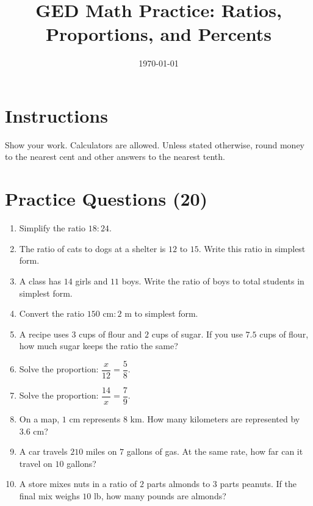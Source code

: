 \documentclass[12pt]{article}
\title{GED Math Practice: Ratios, Proportions, and Percents}
\date{\today}
\begin{document}
\maketitle

\section*{Instructions}
Show your work. Calculators are allowed. Unless stated otherwise, round money to the nearest cent and other answers to the nearest tenth.

\section*{Practice Questions (20)}
\begin{enumerate}

\item Simplify the ratio $18:24$.

\item The ratio of cats to dogs at a shelter is $12$ to $15$. Write this ratio in simplest form.

\item A class has $14$ girls and $11$ boys. Write the ratio of boys to total students in simplest form.

\item Convert the ratio $150\text{ cm} : 2\text{ m}$ to simplest form.

\item A recipe uses $3$ cups of flour and $2$ cups of sugar. If you use $7.5$ cups of flour, how much sugar keeps the ratio the same?

\item Solve the proportion: $\dfrac{x}{12} = \dfrac{5}{8}$.

\item Solve the proportion: $\dfrac{14}{x} = \dfrac{7}{9}$.

\item On a map, $1$ cm represents $8$ km. How many kilometers are represented by $3.6$ cm?

\item A car travels $210$ miles on $7$ gallons of gas. At the same rate, how far can it travel on $10$ gallons?

\item A store mixes nuts in a ratio of $2$ parts almonds to $3$ parts peanuts. If the final mix weighs $10$ lb, how many pounds are almonds?


\end{enumerate}
\end{document}
